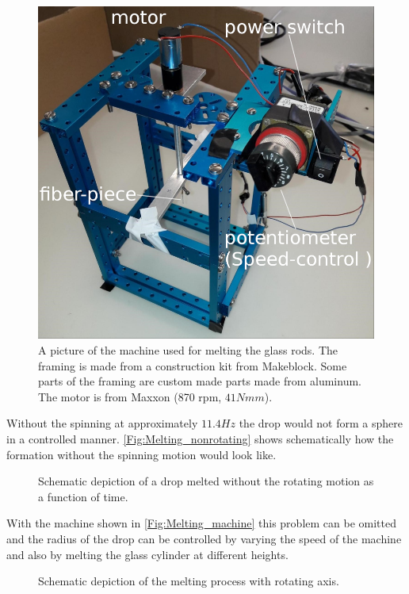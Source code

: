 \begin{figure}[H]
	\includegraphics[scale=0.4]{source/melting_machine_compressed}
	\caption{A picture of the machine used for melting the glass rods. The framing is made from a construction kit from Makeblock. Some parts of the framing are custom made parts made from aluminum. The motor is from Maxxon (870 rpm, $41 \si{Nmm}$).}
	\label{Fig:Melting_machine}
\end{figure}
Without the spinning at approximately $11.4\si{Hz}$ the drop would not form a sphere in a controlled manner. \autoref{Fig:Melting_nonrotating} shows schematically how the formation without the spinning motion would look like.
\begin{figure}[H]
	
	\caption{Schematic depiction of a drop melted without the rotating motion as a function of time.}
	\label{Fig:Melting_nonrotating}
\end{figure}
With the machine shown in \autoref{Fig:Melting_machine} this problem can be omitted and the radius of the drop can be controlled by varying the speed of the machine and also by melting the glass cylinder at different heights.
\begin{figure}[H]
	
	\caption{Schematic depiction of the melting process with rotating axis.}
\end{figure}
